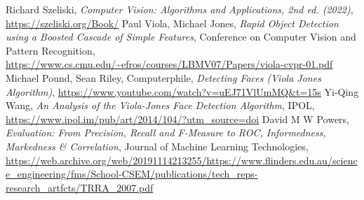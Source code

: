 \documentclass[12pt,a4paper]{article}
\begin{document}
\begin{thebibliography}{5}
    
    Richard Szeliski, \textit{Computer Vision: Algorithms and Applications, 2nd ed. (2022)}, \url{https://szeliski.org/Book/}
    Paul Viola, Michael Jones, \textit{Rapid Object Detection using a Boosted Cascade of Simple Features}, Conference on Computer Vision and Pattern Recognition, \url{https://www.cs.cmu.edu/~efros/courses/LBMV07/Papers/viola-cvpr-01.pdf}
    Michael Pound, Sean Riley, Computerphile, \textit{Detecting Faces (Viola Jones Algorithm)}, \url{https://www.youtube.com/watch?v=uEJ71VlUmMQ&t=15s}
    Yi-Qing Wang, \textit{An Analysis of the Viola-Jones Face Detection Algorithm}, IPOL, \url{https://www.ipol.im/pub/art/2014/104/?utm_source=doi}
    David M W Powers, \textit{Evaluation: From Precision, Recall and F-Measure to ROC, Informedness, Markedness \& Correlation}, Journal of Machine Learning Technologies,  \url{https://web.archive.org/web/20191114213255/https://www.flinders.edu.au/science_engineering/fms/School-CSEM/publications/tech_reps-research_artfcts/TRRA_2007.pdf}


\end{thebibliography}
\end{document}
